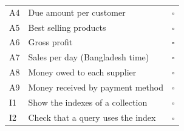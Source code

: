 \documentclass[11pt,a4paper]{article}
\begin{document}
\begin{longtable}{@{}P{1.2cm}P{10.6cm}c@{}}
A4 & Due amount per customer & $\square$ \\
A5 & Best selling products & $\square$ \\
A6 & Gross profit & $\square$ \\
A7 & Sales per day (Bangladesh time) & $\square$ \\
A8 & Money owed to each supplier & $\square$ \\
A9 & Money received by payment method & $\square$ \\
I1 & Show the indexes of a collection & $\square$ \\
I2 & Check that a query uses the index & $\square$ \\
\bottomrule
\end{longtable}
\end{document}
